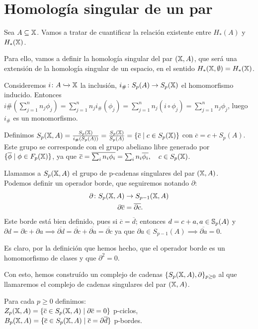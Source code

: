 \section{Homología singular de un par}

Sea $A \subseteq \X$. Vamos a tratar de cuantificar la relación existente entre $H_*(A)$ y $H_*(\X)$.

Para ello, vamos a definir la homología singular del par $(\X, A)$, que será una extensión de la homología singular de un espacio, en el sentido
$H_*(\X, \emptyset) = H_*(\X)$.

Consideremos $i \colon A \xhookrightarrow{} \X$ la inclusión, $i_\# \colon S_p(A) \to \SX{p}$ el homomorfismo inducido.
Entonces $i\#(\sum\limits_{j = 1}^n n_j \phi_j) = \sum\limits_{j = 1}^n n_j i_\#(\phi_j) = \sum\limits_{j = 1}^n n_j (i \circ \phi_j) = \sum\limits_{j = 1}^n n_j \phi_j$,
luego $i_\#$ es un monomorfismo.

Definimos $S_p(\X, A) = \frac{\SX{p}}{i_\#(S_p(A))} = \frac{\SX{p}}{S_p(A)} = \{\overline{c} \mid c \in \SX{p} \}$ con $\overline{c} = c + S_p(A)$.
Este grupo se corresponde con el grupo abeliano libre generado por $\{\overline{\phi} \mid \phi \in \FX{p}\}$, ya que
$ \overline{c} = \overline{\sum_i n_i \phi_i} = \sum_i n_i \overline{\phi_i}, \quad c \in \SX{p}$.

Llamamos a $S_p(\X, A)$ el grupo de p-cadenas singulares del par $(\X, A)$. \\
Podemos definir un operador borde, que seguiremos notando $\partial$:
\begin{align*}
  \partial \colon S_p(\X, A) &\to S_{p-1}(\X, A) \\
  \partial \overline{c} &= \overline{\partial c}.
\end{align*}
Este borde está bien definido, pues si $\overline{c} = \overline{d}$; entonces $d = c + a, a \in \S_p(A)$ y
$\partial d = \partial c + \partial a \implies \overline{\partial d} = \overline{\partial c} + \overline{\partial a} = \overline{\partial c}$ ya que
$\partial a \in S_{p-1}(A) \implies \overline{\partial a} = 0$.

Es claro, por la definición que hemos hecho, que el operador borde es un homomorfismo de clases y que $\partial^2 = 0$.

Con esto, hemos construído un complejo de cadenas $\{S_p(\X, A), \partial\}_{p \geq 0}$ al que llamaremos el complejo de cadenas singulares del par $(\X, A)$.

Para cada $p \geq 0$ definimos: \\
$Z_p(\X, A) = \{\overline{c} \in S_p(\X, A) \mid \partial\overline{c} = 0\}$ p-ciclos, \\
$B_p(\X, A) = \{\overline{c} \in S_p(\X, A) \mid \overline{c} = \partial\overline{d} \}$ p-bordes.


